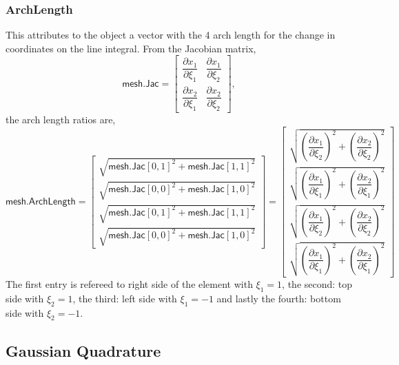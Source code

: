 \documentclass[11pt, a4paper]{article}
\numberwithin{equation}{section}
\begin{document}
\subsubsection*{ArchLength}

This attributes to the object a vector with the 4 arch length for the change in coordinates on the line integral. From the Jacobian matrix,
\begin{equation*}
\textsf{mesh.Jac} = \begin{bmatrix}
\dfrac{\partial x_1}{\partial \xi_1} & \dfrac{\partial x_1}{\partial \xi_2}  \\[0.4cm]
\dfrac{\partial x_2}{\partial \xi_1} & \dfrac{\partial x_2}{\partial \xi_2} 
\end{bmatrix},
\end{equation*}
the arch length ratios are,
\begin{equation*}
\textsf{mesh.ArchLength} = \begin{bmatrix}
\sqrt{\textsf{mesh.Jac}[0,1]^2 + \textsf{mesh.Jac}[1,1]^2} \\[.3cm]
\sqrt{\textsf{mesh.Jac}[0,0]^2 + \textsf{mesh.Jac}[1,0]^2} \\[.3cm]
\sqrt{\textsf{mesh.Jac}[0,1]^2 + \textsf{mesh.Jac}[1,1]^2} \\[.3cm]
\sqrt{\textsf{mesh.Jac}[0,0]^2 + \textsf{mesh.Jac}[1,0]^2}
\end{bmatrix} = \begin{bmatrix}
\sqrt{\left(\dfrac{\partial x_1}{\partial \xi_2}\right)^2 + \left(\dfrac{\partial x_2}{\partial \xi_2}\right)^2}
 \\[.4cm]
\sqrt{\left(\dfrac{\partial x_1}{\partial \xi_1}\right)^2 + \left(\dfrac{\partial x_2}{\partial \xi_1}\right)^2} 
\\[.4cm]
\sqrt{\left(\dfrac{\partial x_1}{\partial \xi_2}\right)^2 + \left(\dfrac{\partial x_2}{\partial \xi_2}\right)^2} 
\\[.4cm]
\sqrt{\left(\dfrac{\partial x_1}{\partial \xi_1}\right)^2 + \left(\dfrac{\partial x_2}{\partial \xi_1}\right)^2}
\end{bmatrix}
\end{equation*}
The first entry is refereed to right side of the element with $\xi_1=1$, the second: top side with $\xi_2=1$, the third: left side with $\xi_1=-1$ and lastly the fourth: bottom side with $\xi_2=-1$.



\subsection{Gaussian Quadrature}
\end{document}
